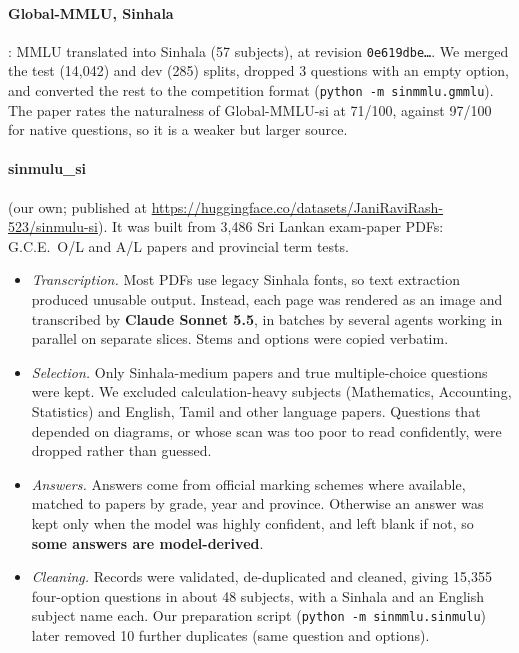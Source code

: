 \documentclass[10pt,a4paper]{article}
\begin{document}
\paragraph{Global-MMLU, Sinhala} \cite{globalmmlu2025}: MMLU translated into Sinhala (57 subjects), at revision
\texttt{0e619dbe\ldots}. We merged the test (14,042) and dev (285) splits, dropped 3 questions with an empty option, and
converted the rest to the competition format (\texttt{python -m sinmmlu.gmmlu}). The paper rates the naturalness of
Global-MMLU-si at 71/100, against 97/100 for native questions, so it is a weaker but larger source.

\paragraph{sinmulu\_si} (our own; published at \url{https://huggingface.co/datasets/JaniRaviRash-523/sinmulu-si}). It was built from 3,486 Sri Lankan exam-paper PDFs:
G.C.E.\ O/L and A/L papers and provincial term tests.
\begin{itemize}
\item \emph{Transcription.} Most PDFs use legacy Sinhala fonts, so text extraction produced unusable output. Instead,
each page was rendered as an image and transcribed by \textbf{Claude Sonnet 5.5}, in batches by several agents working
in parallel on separate slices. Stems and options were copied verbatim.
\item \emph{Selection.} Only Sinhala-medium papers and true multiple-choice questions were kept. We excluded
calculation-heavy subjects (Mathematics, Accounting, Statistics) and English, Tamil and other language papers.
Questions that depended on diagrams, or whose scan was too poor to read confidently, were dropped rather than guessed.
\item \emph{Answers.} Answers come from official marking schemes where available, matched to papers by grade, year
and province. Otherwise an answer was kept only when the model was highly confident, and left blank if not, so
\textbf{some answers are model-derived}.
\item \emph{Cleaning.} Records were validated, de-duplicated and cleaned, giving 15,355 four-option questions in about
48 subjects, with a Sinhala and an English subject name each. Our preparation script (\texttt{python -m sinmmlu.sinmulu})
later removed 10 further duplicates (same question and options).
\end{itemize}
\end{document}
